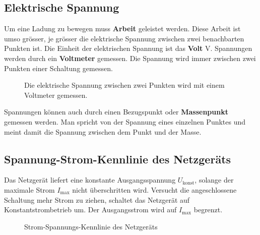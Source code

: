 \subsection{Elektrische Spannung}
Um eine Ladung zu bewegen muss \textbf{Arbeit} geleistet werden. Diese Arbeit ist umso grösser, je grösser die elektrische Spannung zwischen zwei benachbarten Punkten ist. Die Einheit der elektrischen Spannung ist das \textbf{Volt} $\text{V}$. Spannungen werden durch ein \textbf{Voltmeter} gemessen. Die Spannung wird immer zwischen zwei Punkten einer Schaltung gemessen.
\begin{figure}[H]
\centering
{}
\caption{Die elektrische Spannung zwischen zwei Punkten wird mit einem Voltmeter gemessen.}
\end{figure}
Spannungen können auch durch einen Bezugspunkt oder \textbf{Massenpunkt} gemessen werden. Man spricht von der Spannung eines einzelnen Punktes und meint damit die Spannung zwischen dem Punkt und der Masse.
\subsection{Spannung-Strom-Kennlinie des Netzgeräts} 
Das Netzgerät liefert eine konstante Ausgangsspannung $U_{\text{konst}}$, solange der maximale Strom $I_{\text{max}}$ nicht überschritten wird. Versucht die angeschlossene Schaltung mehr Strom zu ziehen, schaltet das Netzgerät auf Konstantstrombetrieb um. Der Ausgangsstrom wird auf $I_{\text{max}}$ begrenzt. 
\begin{figure}[H]
\centering
{}
\caption{Strom-Spannungs-Kennlinie des Netzgeräts}
\end{figure}
